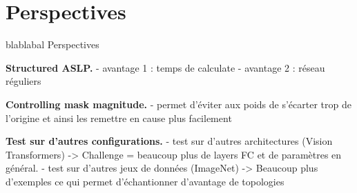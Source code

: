 \section{Perspectives}

blablabal Perspectives

\noindent \textbf{Structured ASLP.}
- avantage 1 : temps de calculate
- avantage 2 : réseau réguliers

\noindent \textbf{Controlling mask magnitude.}
- permet d'éviter aux poids de s'écarter trop de l'origine et ainsi les remettre
en cause plus facilement

\noindent \textbf{Test sur d'autres configurations.}
- test sur d'autres architectures (Vision Transformers) -> Challenge = beaucoup
plus de layers FC et de paramètres en général.
- test sur d'autres jeux de données (ImageNet) -> Beaucoup plus d'exemples ce
qui permet d'échantionner d'avantage de topologies



